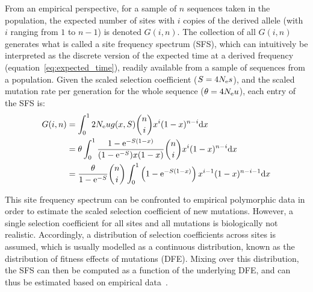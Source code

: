 From an empirical perspective, for a sample of $n$ sequences taken in the population, the expected number of sites with $i$ copies of the derived allele (with $i$ ranging from $1$ to $n - 1$) is denoted $G(i, n)$.
The collection of all $G(i, n)$ generates what is called a site frequency spectrum (\acrshort{SFS}), which can intuitively be interpreted as the discrete version of the expected time at a derived frequency (equation~\ref{eq:expected_time}), readily available from a sample of sequences from a population.
Given the scaled selection coefficient ($S=4 N_{\text{e}} s$), and the scaled mutation rate per generation for the whole sequence ($\theta = 4 N_{\text{e}} u $), each entry of the \acrshort{SFS} is:
\begin{align}
    G(i, n) & = \int_{0}^{1}  2 N_{\text{e}} u g(x, S) \binom{n}{i} x^{i} (1-x)^{n-i} \mathrm{d} x \\
    & = \theta \int_{0}^{1} \dfrac{1 - \text{e}^{-S(1-x)}}{(1 - \text{e}^{-S})x(1-x)} \binom{n}{i} x^{i} (1-x)^{n-i} \mathrm{d} x \\
    & =  \dfrac{\theta }{1 - \text{e}^{-S}} \binom{n}{i} \int_{0}^{1} \left( 1 - \text{e}^{-S(1-x)} \right) x^{i-1} (1-x)^{n-i-1} \mathrm{d} x
\end{align}

This site frequency spectrum can be confronted to empirical polymorphic data in order to estimate the scaled selection coefficient of new mutations.
However, a single selection coefficient for all sites and all mutations is biologically not realistic.
Accordingly, a distribution of selection coefficients across sites is assumed, which is usually modelled as a continuous distribution, known as the distribution of fitness effects of mutations (\acrshort{DFE}).
Mixing over this distribution, the \acrshort{SFS} can then be computed as a function of the underlying \acrshort{DFE}, and can thus be estimated based on empirical data~\citep{eyre-walker_distribution_2006, eyre-walker_estimating_2009}.


